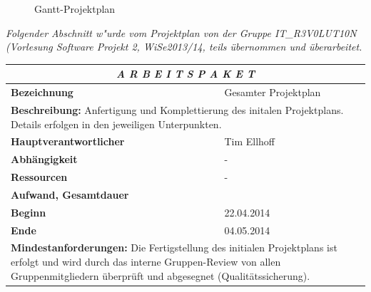 \documentclass[fontsize=12pt,paper=a4,twoside]{scrartcl}
\begin{document}
\begin{figure}[htbp]
\caption{Gantt-Projektplan}

\label{Gantt-Projektplan2}
\end{figure}

\textit{Folgender Abschnitt w"urde vom Projektplan von der Gruppe IT\_R3V0LUT10N (Vorlesung Software Projekt 2, WiSe2013/14, teils übernommen und überarbeitet.}


\begin{tabular}{p{7.5cm}|p{7.5cm}}\toprule
\multicolumn{2}{c}{\textbf{\textit{A R B E I T S P A K E T \quad 1}}} \\ \toprule \hline
\textbf{Bezeichnung} & Gesamter Projektplan\\\hline
\multicolumn{2}{p{15cm}}{\textbf{Beschreibung:} \newline 
Anfertigung und Komplettierung des initalen Projektplans. Details erfolgen in den jeweiligen Unterpunkten.}  \\\hline
\textbf{Hauptverantwortlicher} & Tim Ellhoff\\\hline
\textbf{Abhängigkeit} & -\\\hline
\textbf{Ressourcen} & -\\\hline
\textbf{Aufwand, Gesamtdauer} & \\\hline
\textbf{Beginn} & 22.04.2014 \\\hline
\textbf{Ende} & 04.05.2014\\\hline
\multicolumn{2}{p{15cm}}{\textbf{Mindestanforderungen: } \newline
Die Fertigstellung des initialen Projektplans ist erfolgt und wird durch das interne Gruppen-Review von allen Gruppenmitgliedern überprüft und abgesegnet (Qualitätssicherung).}  \\ \toprule
\end{tabular} \\\\
\end{document}
